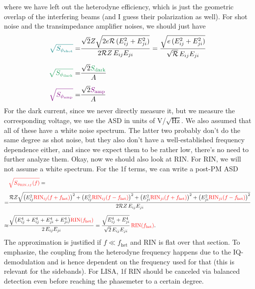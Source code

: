 \documentclass[11pt]{article}
\begin{document}
where we have left out the heterodyne efficiency, which is just the geometric overlap of the interfering beams (and I guess their polarization as well). For shot noise and the transimpedance amplifier noises, we should just have
\begin{align*}
    {\color{teal}\sqrt{S_{\phi_\text{shot}}}}=&\frac{\sqrt 2 Z\sqrt{2e\mathcal{R}\,(E_{ij}^2 + E_{ji}^2)}}{2\mathcal{R} Z \, E_{ij} E_{ji}}=\frac{\sqrt{e\,(E_{ij}^2 + E_{ji}^2)}}{\sqrt \mathcal{R}\,E_{ij} E_{ji}}\\[5pt]
    {\color{ForestGreen}\sqrt{S_{\phi_\text{dark}}}}=&\frac{\sqrt{2}{\color{ForestGreen}S_{\text{dark}}}}{A}\\[5pt]
    {\color{violet}\sqrt{S_{\phi_\text{amp}}}}=&\frac{\sqrt 2{\color{violet}S_\text{amp}}}{A}
\end{align*}
For the dark current, since we never directly measure it, but we measure the corresponding voltage, we use the ASD in units of V/$\sqrt{\text{Hz}}$. We also assumed that all of these have a white noise spectrum. The latter two probably don't do the same degree as shot noise, but they also don't have a well-established frequency dependence either, and since we expect them to be rather low, there's no need to further analyze them. Okay, now we should also look at RIN. For RIN, we will not assume a white spectrum. For the 1f terms, we can write a post-PM ASD
\begin{align*}
    &{\color{red}\sqrt{S_{\phi_{\text{RIN},1f}}(f)}}=\\[4pt]
    =&\frac{\mathcal{R}Z\sqrt{\left(E_{ij}^2{\color{red}\text{RIN}_{ij}(f+f_{\text{het}})}\right)^2 +\left(E_{ij}^2{\color{red}\text{RIN}_{ij}(f-f_{\text{het}})}\right)^2+\left(E_{ji}^2{\color{red}\text{RIN}_{ji}(f+f_{\text{het}})}\right)^2 +\left(E_{ji}^2{\color{red}\text{RIN}_{ji}(f-f_{\text{het}})}\right)^2}}{2\mathcal{R}Z\, E_{ij} E_{ji}}\\[7pt]
    \approx&\frac{\sqrt{\left(E_{ij}^4+E_{ij}^4+E_{ji}^4+E_{ji}^4\right)}{\color{red}\text{RIN}(f_{\text{het}})}}{2\, E_{ij} E_{ji}}=\frac{\sqrt{E_{ij}^4+E_{ji}^4}}{\sqrt 2\, E_{ij} E_{ji}}\, {\color{red}\text{RIN}(f_{\text{het}})}.
\end{align*}
The approximation is justified if $f\ll f_{\text{het}}$ and RIN is flat over that section. To emphasize, the coupling from the heterodyne frequency happens due to the IQ-demodulation and is hence dependent on the frequency used for that (this is relevant for the sidebands). For LISA, 1f RIN should be canceled via balanced detection even before reaching the phasemeter to a certain degree.\\
\end{document}
